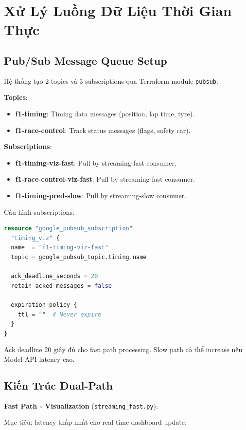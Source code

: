 \documentclass[conference,10pt]{IEEEtran}
\begin{document}
\section{Xử Lý Luồng Dữ Liệu Thời Gian Thực}

\subsection{Pub/Sub Message Queue Setup}

Hệ thống tạo 2 topics và 3 subscriptions qua Terraform module \texttt{pubsub}:

\textbf{Topics}:
\begin{itemize}
    \item \textbf{f1-timing}: Timing data messages (position, lap time, tyre).
    \item \textbf{f1-race-control}: Track status messages (flags, safety car).
\end{itemize}

\textbf{Subscriptions}:
\begin{itemize}
    \item \textbf{f1-timing-viz-fast}: Pull by streaming-fast consumer.
    \item \textbf{f1-race-control-viz-fast}: Pull by streaming-fast consumer.
    \item \textbf{f1-timing-pred-slow}: Pull by streaming-slow consumer.
\end{itemize}

Cấu hình subscriptions:
\begin{lstlisting}[language=terraform]
resource "google_pubsub_subscription"
  "timing_viz" {
  name  = "f1-timing-viz-fast"
  topic = google_pubsub_topic.timing.name

  ack_deadline_seconds = 20
  retain_acked_messages = false

  expiration_policy {
    ttl = ""  # Never expire
  }
}
\end{lstlisting}

Ack deadline 20 giây đủ cho fast path processing. Slow path có thể increase nếu Model API latency cao.

\subsection{Kiến Trúc Dual-Path}

\textbf{Fast Path - Visualization} (\texttt{streaming\_fast.py}):

Mục tiêu: latency thấp nhất cho real-time dashboard update.
\end{document}
